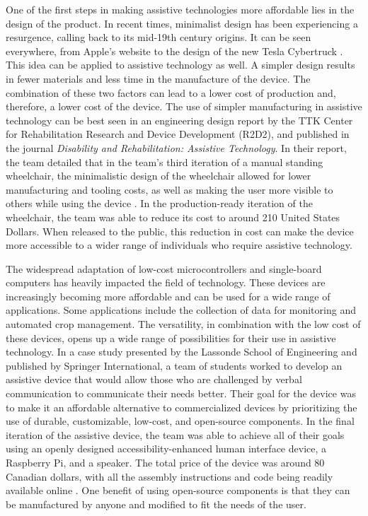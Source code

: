 \documentclass[12pt]{report}
\begin{document}
\begin{raggedright}
    \parindent=36pt
    One of the first steps in making assistive technologies more affordable lies 
    in the design of the product. In recent times, minimalist design has been experiencing a resurgence, calling back to its mid-19th century origins.  It can be seen everywhere,
    from Apple's website to the design of the new Tesla Cybertruck \parencite*{arts909874}. This idea can be applied to
    assistive technology as well. A simpler design results in fewer materials and less time in 
    the manufacture of the device. The combination of these two factors can lead
    to a lower cost of production and, therefore, a lower cost of the device. The use of simpler 
    manufacturing in assistive technology can be best seen in an engineering design report by the 
    TTK Center for Rehabilitation Research and Device Development (R2D2), and published in the journal \textit{Disability and Rehabilitation: Assistive Technology}. In their report, the team 
    detailed that in the team's third iteration of a manual standing wheelchair, the minimalistic design of the 
    wheelchair allowed for lower manufacturing and tooling costs, as well as making the user more 
    visible to others while using the device \parencite{doi:10.1080/17483107.2021.1892839}. In 
    the production-ready iteration of the wheelchair, the team was able to reduce its cost to around 
    210 United States Dollars. When released to the public, this reduction in
    cost can make the device more accessible to a wider range of individuals who require assistive technology.

    \parindent=36pt
    The widespread adaptation of low-cost microcontrollers and single-board computers has 
    heavily impacted the field of technology. These devices are increasingly becoming more affordable and can be used for a
    wide range of applications. Some applications include the collection of data for monitoring 
    and automated crop management. The versatility, in combination with the low cost of these devices, 
    opens up a wide range of possibilities for their use in assistive technology. In a case study
    presented by the Lassonde School of Engineering and published by Springer International, a team of students worked to develop an 
    assistive device that would allow those who are challenged by verbal communication to communicate their needs better. Their goal for the device was to make it an affordable alternative 
    to commercialized devices by prioritizing the use of durable, customizable, low-cost, and open-source 
    components. In the final iteration of the assistive device, the team was able to achieve all of their 
    goals using an openly designed accessibility-enhanced human interface device, a Raspberry Pi, and a speaker. 
    The total price of the device was around 80 Canadian dollars, with all the assembly instructions 
    and code being readily available online \parencite{10.1007/978-3-319-08599-9_44}. One benefit of using open-source components is that they can be manufactured by anyone and modified to fit the needs of the user.


\end{raggedright}
\end{document}
